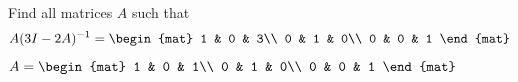 
\begin{Exercise}[
name={},
title={}, 
difficulty=0,
origin={\cite{BS}}]
Find all matrices $A$ such that 
\[
A(3I-2A)^{-1}=\begin{mat}
1 & 0 & 3\\
0 & 1 & 0\\
0 & 0 & 1
\end{mat}
\]
\end{Exercise}
\begin{Answer}
$A=\begin{mat}
1 & 0 & 1\\
0 & 1 & 0\\
0 & 0 & 1
\end{mat}$

\end{Answer}
